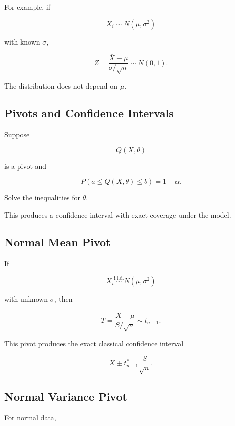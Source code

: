 For example, if

\[
X_i
\sim
N(\mu,\sigma^2)
\]

with known \(\sigma\),

\[
\boxed{
Z
=
\frac{
\overline{X}-\mu
}{
\sigma/\sqrt{n}
}
\sim
N(0,1).
}
\]

The distribution does not depend on \(\mu\).

\subsection{Pivots and Confidence Intervals}
\label{subsec:pivots-confidence-intervals}

Suppose

\[
Q(X,\theta)
\]

is a pivot and

\[
P
(
a
\leq
Q(X,\theta)
\leq
b
)
=
1-\alpha.
\]

Solve the inequalities for \(\theta\).

This produces a confidence interval with exact coverage under the model.

\subsection{Normal Mean Pivot}
\label{subsec:normal-mean-pivot}

If

\[
X_i
\overset{\text{i.i.d.}}{\sim}
N(\mu,\sigma^2)
\]

with unknown \(\sigma\), then

\[
\boxed{
T
=
\frac{
\overline{X}-\mu
}{
S/\sqrt{n}
}
\sim
t_{n-1}.
}
\]

This pivot produces the exact classical confidence interval

\[
\boxed{
\overline{X}
\pm
t^*_{n-1}
\frac{S}{\sqrt{n}}.
}
\]

\subsection{Normal Variance Pivot}
\label{subsec:normal-variance-pivot}

For normal data,

